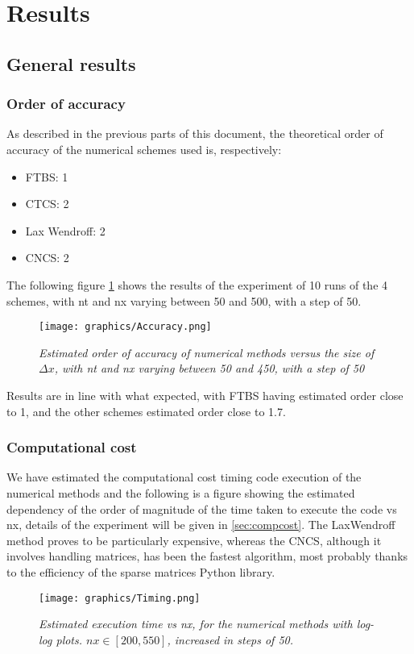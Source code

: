 

\section{Results}

\subsection{General results}

\subsubsection{Order of accuracy}
As described in the previous parts of this document, the theoretical order of accuracy of the numerical schemes used is, respectively:
\begin{itemize}
	\item FTBS: 1
	\item CTCS: 2
	\item Lax Wendroff: 2
	\item CNCS: 2
\end{itemize}
The following figure \ref{fig:orderofacc} shows the results of the experiment of 10 runs of the 4 schemes, with nt and nx varying between 50 and 500, with a step of 50.
\begin{figure}[H]
	\begin{center}
		\texttt{[image: graphics/Accuracy.png]}
	\end{center}%
	\caption[Order of accuracy of numerical methods]{ \em Estimated order of accuracy of numerical methods versus the size of $\Delta x$, with nt and nx varying between 50 and 450, with a step of 50}
	\label{fig:orderofacc}
\end{figure}
Results are in line with what expected, with FTBS having estimated order close to 1, and the other schemes estimated order close to 1.7.

\subsubsection{Computational cost}
We have estimated the computational cost timing code execution of the numerical methods and the following is a figure showing the estimated dependency of the order of magnitude of the time taken to execute the code vs nx, details of the experiment will be given in \ref{sec:compcost}. The LaxWendroff method proves to be particularly expensive, whereas the CNCS, although it involves handling matrices, has been the fastest algorithm, most probably thanks to the efficiency of the sparse matrices Python library.
\begin{figure}[H]
	\begin{center}
		\texttt{[image: graphics/Timing.png]}
	\end{center}%
	\caption[computational cost of numerical methods]{ \em Estimated execution time vs nx, for the numerical methods with log-log plots.  $nx\in [200, 550]$, increased in steps of 50.}
	\label{fig:timing}
\end{figure}

